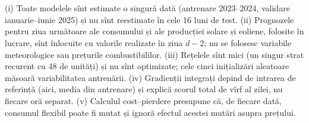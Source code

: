\section{}
%
{(i) Toate modelele sînt estimate o singură dată (antrenare 2023--2024, validare ianuarie--iunie 2025) și nu sînt reestimate în cele 16 luni de test. (ii) Prognozele pentru ziua următoare ale consumului și ale producției solare și eoliene, folosite în lucrare, sînt înlocuite cu valorile realizate în ziua $d-2$; nu se folosesc variabile meteorologice sau prețurile combustibililor.
(iii) Rețelele sînt mici (un singur strat recurent cu 48 de unități) și nu sînt optimizate; cele cinci inițializări aleatoare măsoară variabilitatea antrenării. (iv) Gradienții integrați depind de intrarea de referință (aici, media din antrenare) și explică scorul total de vîrf al zilei, nu fiecare oră separat.
(v) Calculul cost--pierdere presupune că, de fiecare dată, consumul flexibil poate fi mutat și ignoră efectul acestei mutări asupra prețului.}

\newpage
